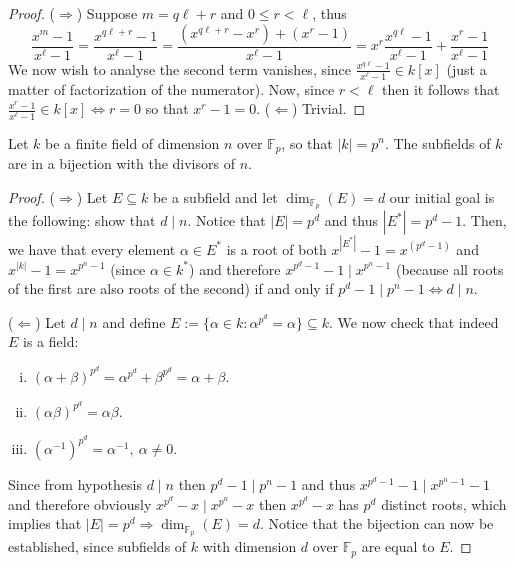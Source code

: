 \begin{proof}
   (\(\Rightarrow\)) Suppose \(m = q\ell + r\) and  \(0 \leqslant r < \ell\),
   thus
   \[
      \frac{x^m - 1}{x^\ell - 1} = \frac{x^{q\ell + r} - 1}{x^\ell - 1} 
      = \frac{(x^{q \ell + r} - x^r) + (x^r - 1)}{x^\ell - 1} 
      = x^r\frac{x^{q\ell} - 1}{x^\ell - 1} + \frac{x^r - 1}{x^\ell - 1}
   \] 
   We now wish to analyse the second term vanishes, since \(\frac{x^{q\ell} -
   1}{x^\ell - 1} \in k[x]\) (just a matter of factorization of the numerator).
   Now, since \(r < \ell\) then it follows that \(\frac{x^r - 1}{x^\ell - 1} \in
   k[x] \Leftrightarrow r = 0\) so that \(x^r - 1 = 0\). (\(\Leftarrow\))
   Trivial.
\end{proof}

\begin{proposition}
   Let \(k\) be a finite field of dimension \(n\) over \(\mathbb{F}_p\), so that
   \(|k| = p^n\). The subfields of \(k\) are in a bijection with the divisors of
   \(n\).
\end{proposition}

\begin{proof}
   (\(\Rightarrow\)) Let \(E \subseteq k\) be a subfield and let
   \(\dim_{\mathbb{F}_p}(E) = d\) our initial goal is the following: show that
   \(d \mid n\). Notice that \(|E| = p^d\) and thus \(|E^\ast| = p^d - 1\).
   Then, we have that every element \(\alpha \in E^\ast\) is a root of both
   \(x^{|E^\ast|} - 1 = x^{(p^d - 1)}\) and \(x^{|k|} - 1 = x^{p^n - 1}\) (since
   \(\alpha \in k^\ast\)) and therefore \(x^{p^d - 1}- 1 \mid x^{p^n - 1}\)
   (because all roots of the first are also roots of the second) if and only if \(p^d - 1
   \mid p^n-1 \Leftrightarrow d \mid n\).

   (\(\Leftarrow\)) Let \(d \mid n\) and define \(E := \{\alpha \in k :
   \alpha^{p^d} = \alpha\} \subseteq k\). We now check that indeed \(E\) is a
   field: 
   \begin{enumerate}[i.]
      \item \((\alpha + \beta)^{p^d} = \alpha^{p^d} + \beta^{p^d} = \alpha +
         \beta\).
      \item \((\alpha\beta)^{p^d} = \alpha\beta\).
      \item \((\alpha^{-1})^{p^d} = \alpha^{-1},\ \alpha \neq 0\).
   \end{enumerate}
   Since from hypothesis \(d \mid n\) then \(p^d - 1 \mid p^n - 1\) and thus
   \(x^{p^d-1}- 1 \mid x^{p^n-1}-1\) and therefore obviously \(x^{p^d} - x \mid
   x^{p^n} - x\) then \(x^{p^d} - x\) has \(p^d\) distinct roots, which implies
   that \(|E| = p^d \Rightarrow \dim_{\mathbb{F}_p}(E) = d\). Notice that the
   bijection can now be established, since subfields of \(k\) with dimension
   \(d\) over \(\mathbb{F}_p\) are equal to \(E\).
\end{proof}


